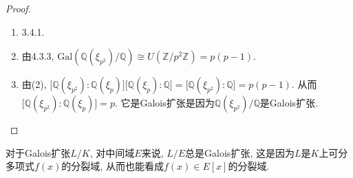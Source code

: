 \documentclass{../solutions-cn}
\begin{document}
\begin{proof}
    \begin{enumerate}[(1)]
        \item 3.4.1.
        \item 由4.3.3, $\mathrm{Gal}(\mathbb{Q}(\xi_{p^2})/\mathbb{Q}) \cong U(\mathbb{Z}/p^2\mathbb{Z}) = p(p - 1)$.
        \item 由(2), $\bigl[\mathbb{Q}(\xi_{p^2}):\mathbb{Q}(\xi_p)\bigr]\bigl[\mathbb{Q}(\xi_p):\mathbb{Q}\bigr] = \bigl[\mathbb{Q}(\xi_{p^2}):\mathbb{Q}\bigr] = p(p - 1)$. 从而$\bigl[\mathbb{Q}(\xi_{p^2}):\mathbb{Q}(\xi_p)\bigr] = p$. 它是Galois扩张是因为$\mathbb{Q}(\xi_{p^2})/\mathbb{Q}$是Galois扩张.
    \end{enumerate}
\end{proof}

\begin{remark}
    对于Galois扩张$L/K$, 对中间域$E$来说, $L/E$总是Galois扩张, 这是因为$L$是$K$上可分多项式$f(x)$的分裂域, 从而也能看成$f(x) \in E[x]$的分裂域.
\end{remark}
\end{document}

